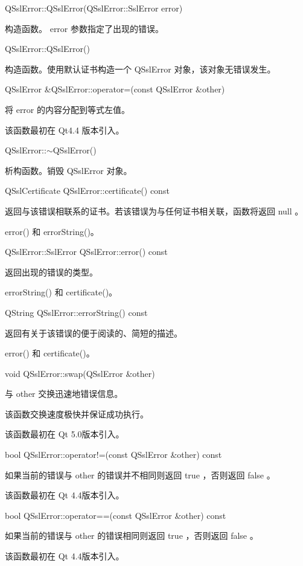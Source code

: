 QSslError::QSslError(QSslError::SslError error)

构造函数。
error 参数指定了出现的错误。

QSslError::QSslError()

构造函数。使用默认证书构造一个 QSslError 对象，该对象无错误发生。

QSslError \&QSslError::operator=(const QSslError \&other)

将 error 的内容分配到等式左值。

该函数最初在 Qt4.4 版本引入。

QSslError::$\sim$QSslError()

析构函数。销毁 QSslError 对象。

QSslCertificate QSslError::certificate() const

返回与该错误相联系的证书。若该错误为与任何证书相关联，函数将返回 null 。

\begin{seeAlso}
error() 和 errorString()。
\end{seeAlso}

QSslError::SslError QSslError::error() const

返回出现的错误的类型。

\begin{seeAlso}
errorString() 和 certificate()。
\end{seeAlso}

QString QSslError::errorString() const

返回有关于该错误的便于阅读的、简短的描述。

\begin{seeAlso}
error() 和 certificate()。
\end{seeAlso}

void QSslError::swap(QSslError \&other)

与 other 交换迅速地错误信息。

该函数交换速度极快并保证成功执行。

该函数最初在 Qt 5.0版本引入。

bool QSslError::operator!=(const QSslError \&other) const

如果当前的错误与 other 的错误并不相同则返回 true ，否则返回 false 。

该函数最初在 Qt 4.4版本引入。

bool QSslError::operator==(const QSslError \&other) const

如果当前的错误与 other 的错误相同则返回 true ，否则返回 false 。

该函数最初在 Qt 4.4版本引入。